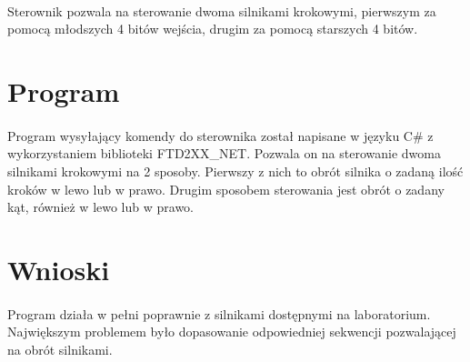 \documentclass[wide,a4paper,titlepage,12pt] {article}
\begin{document}
\paragraph{}
Sterownik pozwala na sterowanie dwoma silnikami krokowymi, pierwszym za pomocą młodszych 4 bitów wejścia, drugim za pomocą starszych 4 bitów.

\section{Program}
\paragraph{}
Program wysyłający komendy do sterownika został napisane w języku C\# z wykorzystaniem biblioteki FTD2XX\_NET.
Pozwala on na sterowanie dwoma silnikami krokowymi na 2 sposoby. Pierwszy z nich to obrót silnika o zadaną ilość kroków w lewo lub w prawo.
Drugim sposobem sterowania jest obrót o zadany kąt, również w lewo lub w prawo.

\section{Wnioski}
\paragraph{}
Program działa w pełni poprawnie z silnikami dostępnymi na laboratorium.
Największym problemem było dopasowanie odpowiedniej sekwencji pozwalającej na obrót silnikami.
\end{document}
